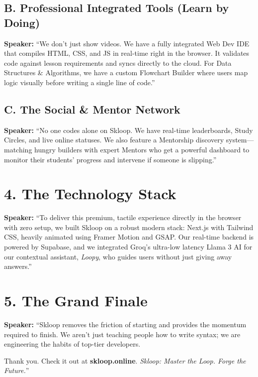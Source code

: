 \documentclass[12pt,a4paper]{article}
\begin{document}
\subsection*{B. Professional Integrated Tools (Learn by Doing)}
\textbf{Speaker:} ``We don't just show videos. We have a fully integrated Web Dev IDE that compiles HTML, CSS, and JS in real-time right in the browser. It validates code against lesson requirements and syncs directly to the cloud. For Data Structures \& Algorithms, we have a custom Flowchart Builder where users map logic visually before writing a single line of code.''

\subsection*{C. The Social \& Mentor Network}
\textbf{Speaker:} ``No one codes alone on Skloop. We have real-time leaderboards, Study Circles, and live online statuses. We also feature a Mentorship discovery system—matching hungry builders with expert Mentors who get a powerful dashboard to monitor their students' progress and intervene if someone is slipping.''

\vspace{0.5cm}

\section*{4. The Technology Stack}
\textbf{Speaker:} ``To deliver this premium, tactile experience directly in the browser with zero setup, we built Skloop on a robust modern stack: Next.js with Tailwind CSS, heavily animated using Framer Motion and GSAP. Our real-time backend is powered by Supabase, and we integrated Groq's ultra-low latency Llama 3 AI for our contextual assistant, \textit{Loopy}, who guides users without just giving away answers.''

\vspace{0.5cm}

\section*{5. The Grand Finale}
\textbf{Speaker:} ``Skloop removes the friction of starting and provides the momentum required to finish. We aren't just teaching people how to write syntax; we are engineering the habits of top-tier developers.

Thank you. Check it out at \textbf{skloop.online}. \textit{Skloop: Master the Loop. Forge the Future.}''
\end{document}
